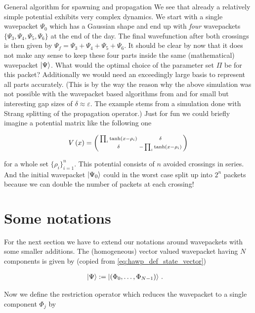 \begin{chapter}{General algorithm for spawning and propagation}
We see that already a relatively simple potential exhibits very complex dynamics.
We start with a single wavepacket $\Psi_0$ which has a Gaussian shape and end up
with \emph{four} wavepackets $\{\Psi_3, \Psi_4, \Psi_5, \Psi_6\}$ at the end of
the day. The final wavefunction after both crossings is then given by $\Psi_f = \Psi_3 + \Psi_4 + \Psi_5 + \Psi_6$.
It should be clear by now that it does not make any sense to keep these four parts
inside the same (mathematical) wavepacket $\Ket{\Psi}$. What would the optimal
choice of the parameter set $\Pi$ be for this packet? Additionally we would need
an exceedingly large basis to represent all parts accurately. (This is by the way
the reason why the above simulation was not possible with the wavepacket based algorithms
from \cite{FGL_semiclassical_dynamics} and \cite{BGH_natac} for
small but interesting gap sizes of $\delta \approx \varepsilon$. The example stems
from a simulation done with Strang splitting of the propagation operator.) Just
for fun we could briefly imagine a potential matrix like the following one

\begin{equation*}
  V\left( x \right) =
  \left(\begin{smallmatrix}
  \prod_i\tanh\left( x-\rho_i \right) & \delta\\
  \delta                     & - \prod_i\tanh\left( x-\rho_i \right)
  \end{smallmatrix}\right)
\end{equation*}

for a whole set $\{\rho_i\}_{i=1}^n$. This potential consists of $n$ avoided
crossings in series. And the initial wavepacket $\Ket{\Psi_0}$ could in the
worst case split up into $2^n$ packets because we can double the number of packets
at each crossing!


\section{Some notations}

For the next section we have to extend our notations around wavepackets with
some smaller additions. The (homogeneous) vector valued wavepacket having $N$
components is given by (copied from \eqref{eq:hawp_def_state_vector})

\begin{align}
  \Ket{\Psi} & := \Ket{\left(\Phi_0, \hdots, \Phi_{N-1}\right)} \,.
\end{align}

Now we define the restriction operator which reduces the wavepacket to a single
component $\Phi_j$ by


\end{chapter}
